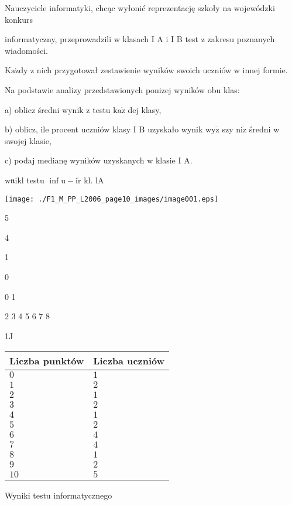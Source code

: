 \documentclass[a4paper,12pt]{article}
\begin{document}
Nauczyciele informatyki, chcąc wyłonić reprezentację szkoły na wojewódzki konkurs

informatyczny, przeprowadzili w klasach I A i I $\mathrm{B}$ test z zakresu poznanych wiadomości.

$\mathrm{K}\mathrm{a}\dot{\mathrm{z}}\mathrm{d}\mathrm{y}$ z nich przygotował zestawienie wyników swoich uczniów w innej formie.

Na podstawie analizy przedstawionych ponizej wyników obu klas:

a) oblicz średni wynik z testu $\mathrm{k}\mathrm{a}\dot{\mathrm{z}}$ dej klasy,

b) oblicz, ile procent uczniów klasy I $\mathrm{B}$ uzyskało wynik $\mathrm{w}\mathrm{y}\dot{\mathrm{z}}$ szy $\mathrm{n}\mathrm{i}\dot{\mathrm{z}}$ średni w swojej klasie,

c) podaj medianę wyników uzyskanych w klasie I A.

$\mathrm{w}\mathfrak{n}\mathrm{i}\mathrm{k}\mathrm{l}$ testu $\displaystyle \inf \mathrm{u}-\mathrm{i}\acute{\mathrm{r}}$ kl. lA
\begin{center}
\texttt{[image: ./F1\_M\_PP\_L2006\_page10\_images/image001.eps]}
\end{center}
5

4

1

0

0 1

2 3 4 5 6 7 8

1J
\begin{center}
\begin{tabular}{|l|l|}
\hline
\multicolumn{1}{|l|}{Liczba punktów}&	\multicolumn{1}{|l|}{Liczba uczniów}	\\
\hline
\multicolumn{1}{|l|}{$0$}&	\multicolumn{1}{|l|}{ $1$}	\\
\hline
\multicolumn{1}{|l|}{ $1$}&	\multicolumn{1}{|l|}{ $2$}	\\
\hline
\multicolumn{1}{|l|}{ $2$}&	\multicolumn{1}{|l|}{ $1$}	\\
\hline
\multicolumn{1}{|l|}{ $3$}&	\multicolumn{1}{|l|}{ $2$}	\\
\hline
\multicolumn{1}{|l|}{ $4$}&	\multicolumn{1}{|l|}{ $1$}	\\
\hline
\multicolumn{1}{|l|}{ $5$}&	\multicolumn{1}{|l|}{ $2$}	\\
\hline
\multicolumn{1}{|l|}{ $6$}&	\multicolumn{1}{|l|}{ $4$}	\\
\hline
\multicolumn{1}{|l|}{ $7$}&	\multicolumn{1}{|l|}{ $4$}	\\
\hline
\multicolumn{1}{|l|}{ $8$}&	\multicolumn{1}{|l|}{ $1$}	\\
\hline
\multicolumn{1}{|l|}{ $9$}&	\multicolumn{1}{|l|}{ $2$}	\\
\hline
\multicolumn{1}{|l|}{ $10$}&	\multicolumn{1}{|l|}{ $5$}	\\
\hline
\end{tabular}

\end{center}
Wyniki testu informatycznego
\end{document}
